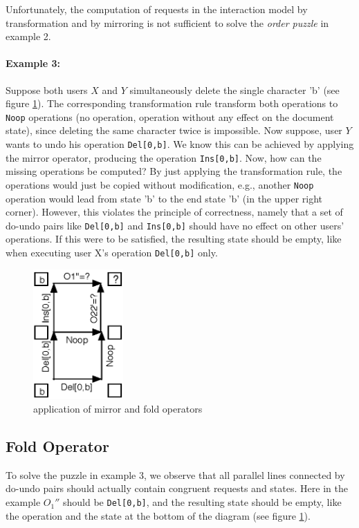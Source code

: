 Unfortunately, the computation of requests in the interaction model by transformation and by mirroring is not sufficient to solve the \emph{order puzzle} in example 2.

\paragraph{Example 3:} Suppose both users $X$ and $Y$ simultaneously delete the single character 'b' (see figure \ref{fig:concepts.basicfold}). The corresponding transformation rule transform both operations to \texttt{Noop} operations (no operation, operation without any effect on the document state), since deleting the same character twice is impossible. Now suppose, user $Y$ wants to undo his operation \texttt{Del[0,b]}. We know this can be achieved by applying the mirror operator, producing the operation \texttt{Ins[0,b]}. Now, how can the missing operations be computed? By just applying the transformation rule, the operations would just be copied without modification, e.g., another \texttt{Noop} operation would lead from state 'b' to the end state 'b' (in the upper right corner). However, this violates the principle of correctness, namely that a set of do-undo pairs like \texttt{Del[0,b]} and \texttt{Ins[0,b]} should have no effect on other users' operations. If this were to be satisfied, the resulting state should be empty, like when executing user X's operation \texttt{Del[0,b]} only. 

\begin{figure}[htb]
 \centering
 \includegraphics[width=3.45cm,height=4.97cm]{../../images/concepts_basicfold.eps}
 \caption{application of mirror and fold operators}
 \label{fig:concepts.basicfold}
\end{figure}


\subsection{Fold Operator}
To solve the puzzle in example 3, we observe that all parallel lines connected by do-undo pairs should actually contain congruent requests and states. Here in the example $O_{1}''$ should be \texttt{Del[0,b]}, and the resulting state should be empty, like the operation and the state at the bottom of the diagram (see figure \ref{fig:concepts.basicfold}).

